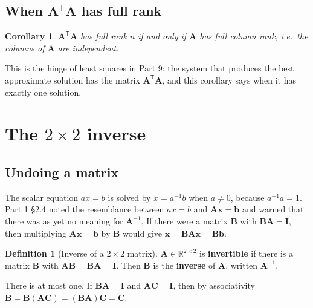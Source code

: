 \documentclass[11pt]{article}
\theoremstyle{plain}
\newtheorem{cor}[thm]{Corollary}
\theoremstyle{definition}
\newtheorem{defn}{Definition}[section]
\theoremstyle{remark}
\newcommand{\R}{\mathbb{R}}
\newcommand{\vc}[1]{\mathbf{#1}}
\newcommand{\mt}[1]{\mathbf{#1}}
\newcommand{\T}{^{\mathsf{T}}}
\begin{document}
\subsection{When \texorpdfstring{$\mt{A}\T\mt{A}$}{A'A} has full rank}
\begin{cor}
\label{cor:ATAfull}
$\mt{A}\T\mt{A}$ has full rank $n$ if and only if $\mt{A}$ has full column rank,
i.e.\ the columns of $\mt{A}$ are independent.
\end{cor}

\noindent This is the hinge of least squares in Part 9: the system that
produces the best approximate solution has the matrix $\mt{A}\T\mt{A}$, and this
corollary says when it has exactly one solution.

\section{The \texorpdfstring{$2\times2$}{2x2} inverse}

\subsection{Undoing a matrix}
The scalar equation $ax=b$ is solved by $x=a^{-1}b$ when $a\neq0$, because
$a^{-1}a=1$. Part 1 \S2.4 noted the resemblance between $ax=b$ and
$\mt{A}\vc{x}=\vc{b}$ and warned that there was as yet no meaning for
$\mt{A}^{-1}$. If there were a matrix $\mt{B}$ with $\mt{B}\mt{A}=\mt{I}$, then
multiplying $\mt{A}\vc{x}=\vc{b}$ by $\mt{B}$ would give
$\vc{x}=\mt{B}\mt{A}\vc{x}=\mt{B}\vc{b}$.

\begin{defn}[Inverse of a $2\times2$ matrix]
$\mt{A}\in\R^{2\times2}$ is \textbf{invertible} if there is a matrix $\mt{B}$
with $\mt{A}\mt{B}=\mt{B}\mt{A}=\mt{I}$. Then $\mt{B}$ is the \textbf{inverse}
of $\mt{A}$, written $\mt{A}^{-1}$.
\end{defn}

\noindent There is at most one. If $\mt{B}\mt{A}=\mt{I}$ and $\mt{A}\mt{C}=\mt{I}$,
then by associativity
$\mt{B}=\mt{B}(\mt{A}\mt{C})=(\mt{B}\mt{A})\mt{C}=\mt{C}$.
\end{document}
